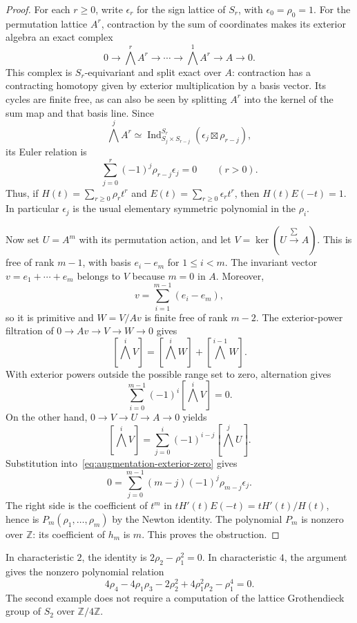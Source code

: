 \begin{proof}
For each $r\geq0$, write $\epsilon_r$ for the sign lattice of $S_r$,
with $\epsilon_0=\rho_0=1$.  For the permutation lattice
$A^r$, contraction by the sum of coordinates makes its exterior
algebra an exact complex
\[
 0\longrightarrow\bigwedge^r A^r\longrightarrow\cdots
 \longrightarrow\bigwedge^1 A^r\longrightarrow A
 \longrightarrow0.
\]
This complex is $S_r$-equivariant and split exact over $A$: contraction
has a contracting homotopy given by exterior multiplication by a
basis vector.  Its cycles are finite free, as can also be seen by
splitting $A^r$ into the kernel of the sum map and that basis line.
Since
\[
 \bigwedge^j A^r\simeq
 \operatorname{Ind}_{S_j\times S_{r-j}}^{S_r}
 (\epsilon_j\boxtimes\rho_{r-j}),
\]
its Euler relation is
\[
 \sum_{j=0}^r(-1)^j\rho_{r-j}\epsilon_j=0
 \qquad(r>0).
\]
Thus, if $H(t)=\sum_{r\geq0}\rho_rt^r$ and
$E(t)=\sum_{r\geq0}\epsilon_rt^r$, then $H(t)E(-t)=1$.
In particular $\epsilon_j$ is the usual elementary symmetric
polynomial in the $\rho_i$.

Now set $U=A^m$ with its permutation action, and let
$V=\ker(U\xrightarrow{\sum} A)$.  This is free of rank $m-1$,
with basis $e_i-e_m$ for $1\leq i<m$.  The invariant vector
$v=e_1+\cdots+e_m$ belongs to $V$ because $m=0$ in $A$.
Moreover,
\[
 v=\sum_{i=1}^{m-1}(e_i-e_m),
\]
so it is primitive and $W=V/Av$ is finite free of rank $m-2$.
The exterior-power filtration of
$0\to Av\to V\to W\to0$ gives
\[
 [\textstyle\bigwedge^i V]
 =[\textstyle\bigwedge^i W]+[\textstyle\bigwedge^{i-1}W].
\]
With exterior powers outside the possible range set to zero,
alternation gives
\begin{equation}\label{eq:augmentation-exterior-zero}
 \sum_{i=0}^{m-1}(-1)^i[\textstyle\bigwedge^iV]=0.
\end{equation}
On the other hand, $0\to V\to U\to A\to0$ yields
\[
 [\textstyle\bigwedge^iV]
 =\sum_{j=0}^i(-1)^{i-j}[\textstyle\bigwedge^jU].
\]
Substitution into~\eqref{eq:augmentation-exterior-zero} gives
\[
 0=\sum_{j=0}^{m-1}(m-j)(-1)^j
       \rho_{m-j}\epsilon_j.
\]
The right side is the coefficient of $t^m$ in
$tH'(t)E(-t)=tH'(t)/H(t)$, hence is
$P_m(\rho_1,\ldots,\rho_m)$ by the Newton identity.  The
polynomial $P_m$ is nonzero over $\mathbb Z$: its coefficient of
$h_m$ is $m$.  This proves the obstruction.
\end{proof}

\begin{example}
In characteristic $2$, the identity is
$2\rho_2-\rho_1^2=0$.
In characteristic $4$, the argument gives the nonzero polynomial
relation
\[
 4\rho_4-4\rho_1\rho_3-2\rho_2^2
       +4\rho_1^2\rho_2-\rho_1^4=0.
\]
The second example does not require a computation of the lattice
Grothendieck group of $S_2$ over $\mathbb Z/4\mathbb Z$.
\end{example}
